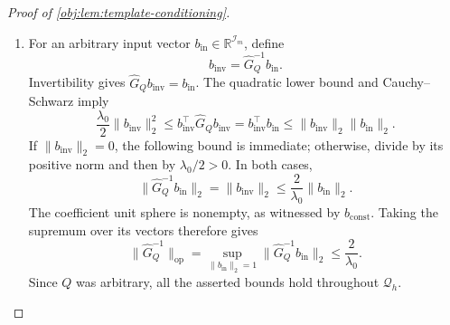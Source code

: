 \begin{proof}[Proof of \cref{obj:lem:template-conditioning}]
\begin{enumerate}
\item For an arbitrary input vector \(b_{\mathrm{in}}\in\mathbb R^{\mathcal I_m}\), define
\[
b_{\mathrm{inv}}=\widehat G_Q^{-1}b_{\mathrm{in}}.
\]
Invertibility gives \(\widehat G_Qb_{\mathrm{inv}}=b_{\mathrm{in}}\). The quadratic lower bound and Cauchy--Schwarz imply
\[
\frac{\lambda_0}{2}\|b_{\mathrm{inv}}\|_2^2
\le b_{\mathrm{inv}}^\top\widehat G_Qb_{\mathrm{inv}}
=b_{\mathrm{inv}}^\top b_{\mathrm{in}}
\le\|b_{\mathrm{inv}}\|_2\|b_{\mathrm{in}}\|_2.
\]
If \(\|b_{\mathrm{inv}}\|_2=0\), the following bound is immediate; otherwise, divide by its positive norm and then by \(\lambda_0/2>0\). In both cases,
\[
\|\widehat G_Q^{-1}b_{\mathrm{in}}\|_2
=\|b_{\mathrm{inv}}\|_2
\le\frac2{\lambda_0}\|b_{\mathrm{in}}\|_2.
\]
The coefficient unit sphere is nonempty, as witnessed by \(b_{\mathrm{const}}\). Taking the supremum over its vectors therefore gives
\[
\|\widehat G_Q^{-1}\|_{\mathrm{op}}
=\sup_{\|b_{\mathrm{in}}\|_2=1}
\|\widehat G_Q^{-1}b_{\mathrm{in}}\|_2
\le\frac2{\lambda_0}.
\]
Since \(Q\) was arbitrary, all the asserted bounds hold throughout \(\mathcal Q_h\).
\end{enumerate}
\end{proof}
